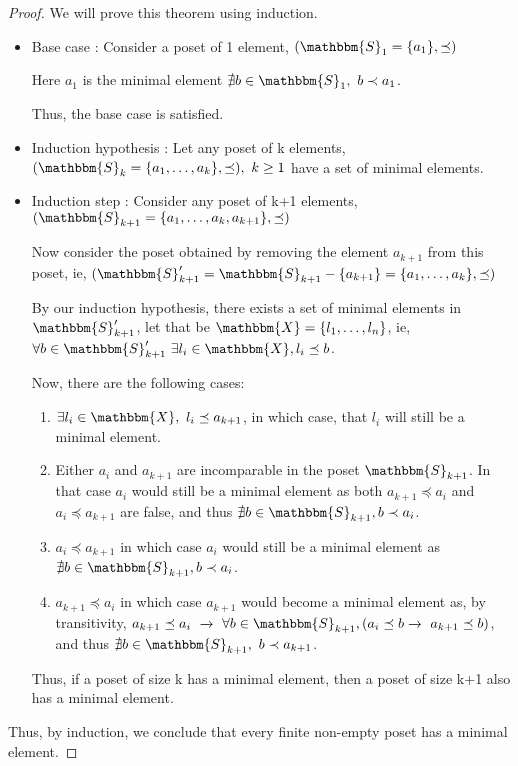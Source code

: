 \documentclass[14pt]{extarticle}
\newcommand{\impl}{\xrightarrow{}}
\newcommand{\Sset}{\mathbbm{S}}
\newcommand{\X}{\mathbbm{X}}
\newcommand{\pordereq}{\preceq}
\newcommand{\porder}{\prec}
\begin{document}
\begin{proof}
    We will prove this theorem using induction.

    \begin{itemize}
        \item Base case : Consider a poset of 1 element, $(\Sset_1 = \{a_1\}, \pordereq)$

        Here $a_1$ is the minimal element $\nexists b \in \Sset_1, \ b \porder a_1$.

        Thus, the base case is satisfied.

        \item Induction hypothesis : Let any poset of k elements, \newline $(\Sset_k = \{a_1, \dots, a_k\}, \pordereq), \ k \geq 1$ have a set of minimal elements.

        \item Induction step : Consider any poset of k+1 elements,
        \newline
        $(\Sset_{k+1} = \{ a_1, \dots, a_k, a_{k+1} \}, \pordereq)$

        Now consider the poset obtained by removing the element $a_{k+1}$ from this poset, ie, $(\Sset'_{k+1} = \Sset_{k+1} -\{a_{k+1}\} = \{ a_1, \dots, a_k \}, \pordereq)$

        By our induction hypothesis, there exists a set of minimal elements in $\Sset'_{k+1}$, let that be $\X = \{l_1, \dots, l_n\}$, ie, $\forall b \in \Sset'_{k+1} \ \exists l_i \in \X, l_i \pordereq b$.

        Now, there are the following cases:

        \begin{enumerate}
            \item $\exists l_i \in \X, \ l_i \pordereq a_{k+1}$, in which case, that $l_i$ will still be a minimal element.
        
            \item Either $a_i$ and $a_{k+1}$ are incomparable in the poset $\Sset_{k+1}$. In that case $a_i$ would still be a minimal element as both $a_{k+1} \pordereq a_i$ and $a_i \pordereq a_{k+1}$ are false, and thus $\nexists b \in \Sset_{k+1}, b \porder a_i$.

            \item $a_i \pordereq a_{k+1}$ in which case $a_i$ would still be a minimal element as $\nexists b \in \Sset_{k+1}, b \porder a_i$.

            \item $a_{k+1} \pordereq a_i$ in which case $a_{k+1}$ would become a minimal element as, by transitivity, $a_{k+1} \pordereq a_i \ \impl \ \forall b \in \Sset_{k+1}, (a_i \pordereq b \impl \ a_{k+1} \pordereq b)$, and thus $\nexists b \in \Sset_{k+1}, \ b \porder a_{k+1}$.
        \end{enumerate}

        Thus, if a poset of size k has a minimal element, then a poset of size k+1 also has a minimal element.
    \end{itemize}

    Thus, by induction, we conclude that every finite non-empty poset has a minimal element.
\end{proof}
\end{document}
